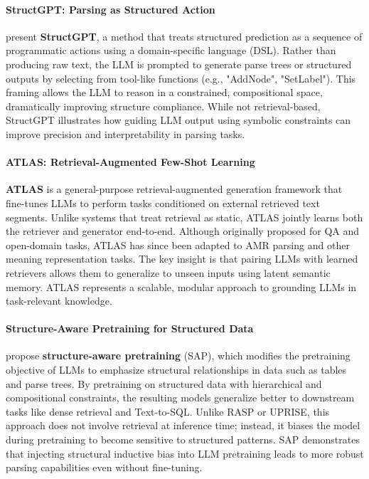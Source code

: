 \paragraph{StructGPT: Parsing as Structured Action}

\citet{lu2023structgpt} present \textbf{StructGPT}, a method that treats structured prediction as a sequence of programmatic actions using a domain-specific language (DSL). Rather than producing raw text, the LLM is prompted to generate parse trees or structured outputs by selecting from tool-like functions (e.g., "AddNode", "SetLabel"). This framing allows the LLM to reason in a constrained, compositional space, dramatically improving structure compliance. While not retrieval-based, StructGPT illustrates how guiding LLM output using symbolic constraints can improve precision and interpretability in parsing tasks.

\paragraph{ATLAS: Retrieval-Augmented Few-Shot Learning}

\textbf{ATLAS} \citep{izacard2024atlas} is a general-purpose retrieval-augmented generation framework that fine-tunes LLMs to perform tasks conditioned on external retrieved text segments. Unlike systems that treat retrieval as static, ATLAS jointly learns both the retriever and generator end-to-end. Although originally proposed for QA and open-domain tasks, ATLAS has since been adapted to AMR parsing and other meaning representation tasks. The key insight is that pairing LLMs with learned retrievers allows them to generalize to unseen inputs using latent semantic memory. ATLAS represents a scalable, modular approach to grounding LLMs in task-relevant knowledge.

\paragraph{Structure-Aware Pretraining for Structured Data}

\citet{li2023structure} propose \textbf{structure-aware pretraining} (SAP), which modifies the pretraining objective of LLMs to emphasize structural relationships in data such as tables and parse trees. By pretraining on structured data with hierarchical and compositional constraints, the resulting models generalize better to downstream tasks like dense retrieval and Text-to-SQL. Unlike RASP or UPRISE, this approach does not involve retrieval at inference time; instead, it biases the model during pretraining to become sensitive to structured patterns. SAP demonstrates that injecting structural inductive bias into LLM pretraining leads to more robust parsing capabilities even without fine-tuning.

